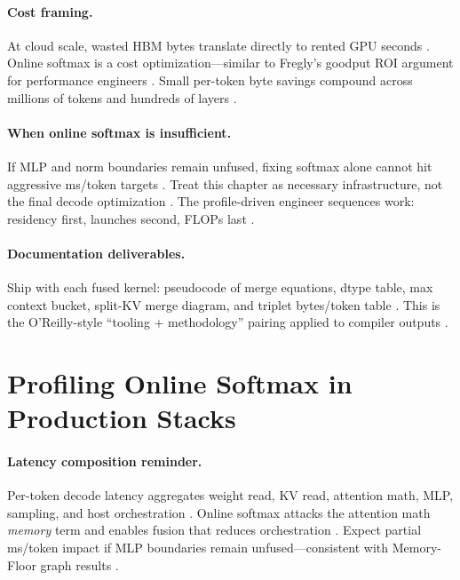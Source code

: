 \paragraph{Cost framing.} At cloud scale, wasted HBM bytes translate directly to rented GPU seconds \citep{patel2025llminference,liu2024deepseekv3}. Online softmax is a cost optimization---similar to Fregly's goodput ROI argument for performance engineers \citep{taxbreak2026,dlbook}. Small per-token byte savings compound across millions of tokens and hundreds of layers \citep{memoryfloor2026,kwon2023vllm}.

\paragraph{When online softmax is insufficient.} If MLP and norm boundaries remain unfused, fixing softmax alone cannot hit aggressive ms/token targets \citep{taxbreak2026,patel2025llminference}. Treat this chapter as necessary infrastructure, not the final decode optimization \citep{yirage2026,dao2023flashdecoding}. The profile-driven engineer sequences work: residency first, launches second, FLOPs last \citep{memoryfloor2026,semianalysis2024tma}.

\paragraph{Documentation deliverables.} Ship with each fused kernel: pseudocode of merge equations, dtype table, max context bucket, split-KV merge diagram, and triplet bytes/token table \citep{yirage2026,chen2020compilerbasedhardw,amd2024xdna}. This is the O'Reilly-style ``tooling + methodology'' pairing applied to compiler outputs \citep{patel2025llminference,taxbreak2026}.

\section{Profiling Online Softmax in Production Stacks}
\label{sec:ch10_profiling}
\paragraph{Latency composition reminder.} Per-token decode latency aggregates weight read, KV read, attention math, MLP, sampling, and host orchestration \citep{taxbreak2026,patel2025llminference,kwon2023vllm}. Online softmax attacks the attention math \emph{memory} term and enables fusion that reduces orchestration \citep{dao2022flashattention,memoryfloor2026,yirage2026}. Expect partial ms/token impact if MLP boundaries remain unfused---consistent with Memory-Floor graph results \citep{memoryfloor2026,nvidia2024cudagraphs}.

